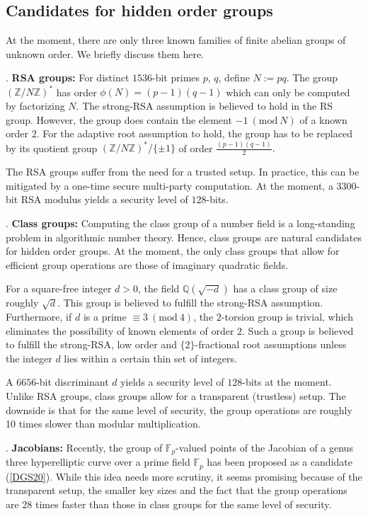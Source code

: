\documentclass[11pt, lettersize, notitlepage, leqno, footskip=0.6cm]{article}
\newcommand{\bz}{\mathbb Z}
\newcommand{\bq}{\mathbb Q}
\newcommand{\bFp}{\mathbb{F}_p}
\newcommand{\noin}{\noindent}
\newcommand{\Mod}[1]{\ (\mathrm{mod}\ #1)}
\numberwithin{equation}{section}
\begin{document}
\subsection{\fontsize{11}{11}\selectfont Candidates for hidden order groups }

At the moment, there are only three known families of finite abelian groups of unknown order. We briefly discuss them here.\vspace{0.1cm} 

\noin 1. \textbf{RSA groups:} For distinct $1536$-bit primes $p$, $q$, define $N:= pq$. The group $(\bz/N\bz)^*$ has order $\phi(N) = (p-1)(q-1)$ which can only be computed by factorizing $N$. The strong-RSA assumption is believed to hold in the RS group. However, the group does contain the element $-1\Mod{N}$ of a known order $2$. For the adaptive root assumption to hold, the group has to be replaced by its quotient group $(\bz/N\bz)^*/\{\pm 1\}$ of order $\frac{(p-1)(q-1)}{2}.$ 

The RSA groups suffer from the need for a trusted setup. In practice, this can be mitigated by a one-time secure multi-party computation. At the moment, a $3300$-bit RSA modulus yields a security level of $128$-bits.


\noin 2. \textbf{Class groups:} Computing the class group of a number field is a long-standing problem in algorithmic number theory. Hence, class groups are natural candidates for hidden order groups. At the moment, the only class groups that allow for efficient group operations are those of imaginary quadratic fields.

For a square-free integer $d > 0$, the field $\bq(\sqrt{-d})$ has a class group of size roughly $\sqrt{d}$. This group is believed to fulfill the strong-RSA assumption. Furthermore, if $d$ is a prime $\equiv 3 \Mod{4}$, the $2$-torsion group is trivial, which eliminates the possibility of known elements of order $2$. Such a group is believed to fulfill the strong-RSA, low order and $\{2\}$-fractional root assumptions unless the integer $d$ lies within a certain thin set of integers.

A $6656$-bit discriminant $d$ yields a security level of $128$-bits at the moment. Unlike RSA groups, class groups allow for a transparent (trustless) setup. The downside is that for the same level of security, the group operations are roughly 10 times slower than modular multiplication.

\noin 3. \textbf{Jacobians:} Recently, the group of $\bFp$-valued points of the Jacobian of a genus three hyperelliptic curve over a prime field $\bFp$ has been proposed as a candidate (\hyperlink{DGS20}{[DGS20]}). While this idea needs more scrutiny, it seems promising because of the transparent setup, the smaller key sizes and the fact that the group operations are 28 times faster than those in class groups for the same level of security.
\end{document}
